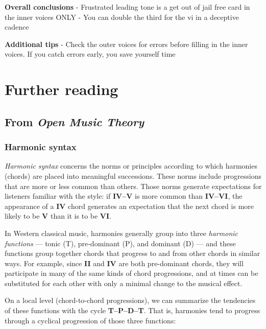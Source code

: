 \documentclass{book}
\begin{document}
\textbf{Overall conclusions} - Frustrated leading tone is a get out of jail
free card in the inner voices ONLY - You can double the third for the vi in a
deceptive cadence

\textbf{Additional tips} - Check the outer voices for errors before filling in
the inner voices. If you catch errors early, you save yourself time

\hypertarget{further-reading-23}{%
\chapter{Further reading}\label{further-reading-23}}

\hypertarget{from-open-music-theory-22}{%
\section{\texorpdfstring{From \emph{Open Music
Theory}}{From Open Music Theory}}\label{from-open-music-theory-22}}

\hypertarget{harmonic-syntax}{%
\subsection{Harmonic syntax}\label{harmonic-syntax}}

\emph{Harmonic syntax} concerns the norms or principles according to which
harmonies (chords) are placed into meaningful successions. These norms include
progressions that are more or less common than others. Those norms generate
expectations for listeners familiar with the style: if \textbf{IV--V} is more
common than \textbf{IV--VI}, the appearance of a \textbf{IV} chord generates
an expectation that the next chord is more likely to be \textbf{V} than it is
to be \textbf{VI}.

In Western classical music, harmonies generally group into three
\emph{harmonic functions} --- tonic (T), pre-dominant (P), and dominant (D)
--- and these functions group together chords that progress to and from other
chords in similar ways. For example, since \textbf{II} and \textbf{IV} are
both pre-dominant chords, they will participate in many of the same kinds of
chord progressions, and at times can be substituted for each other with only a
minimal change to the musical effect.

On a local level (chord-to-chord progressions), we can summarize the
tendencies of these functions with the cycle \textbf{T--P--D--T}. That is,
harmonies tend to progress through a cyclical progression of those three
functions:
\end{document}
